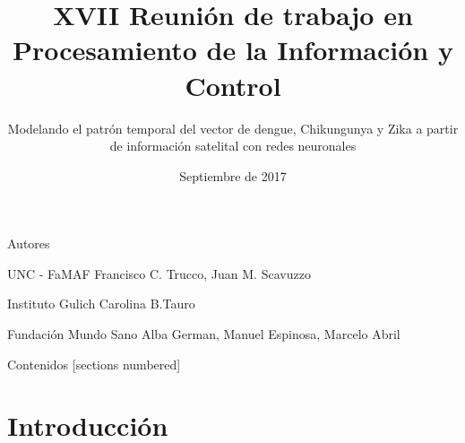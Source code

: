 \documentclass[10pt]{beamer}
\title{XVII Reunión de trabajo en Procesamiento de la Información y Control}
\subtitle{Modelando el patrón temporal del vector de dengue, Chikungunya y Zika
  a partir de información satelital con redes neuronales}
\date{Septiembre de 2017}
\begin{document}
\maketitle

\begin{frame}{Autores}
	\begin{alertblock}{UNC - FaMAF}
    Francisco C. Trucco, Juan M. Scavuzzo
	\end{alertblock}

	\begin{alertblock}{Instituto Gulich}
    Carolina B.Tauro
	\end{alertblock}

	\begin{alertblock}{Fundación Mundo Sano}
    Alba German, Manuel Espinosa, Marcelo Abril
	\end{alertblock}
\end{frame}


\begin{frame}{Contenidos}
  [sections numbered]
  \tableofcontents[hideallsubsections]
\end{frame}

\section{Introducción}
\end{document}
